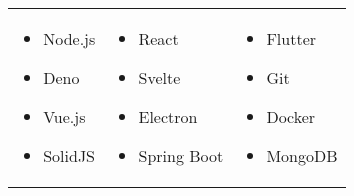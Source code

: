 {  

  {\begin{tabularx}{0.65\textwidth}{ X X X }
      \begin{itemize}
        \item Node.js
        \item Deno
        \item Vue.js
        \item SolidJS
      \end{itemize}
       &
      \begin{itemize}
        \item React
        \item Svelte
        \item Electron
        \item Spring Boot
      \end{itemize}
       &
      \begin{itemize}
        \item Flutter
        \item Git
        \item Docker
        \item MongoDB
      \end{itemize}
    \end{tabularx}}
}


